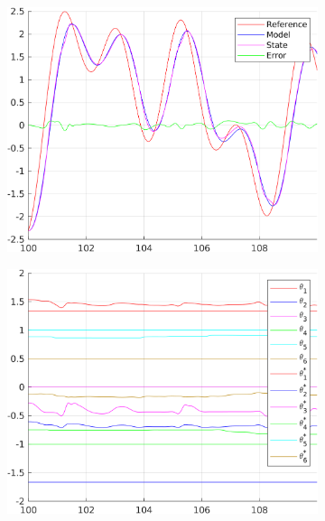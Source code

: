 \documentclass[12pt,a4paper]{article}
\begin{document}
	\begin{figure}[H]
		\centering
		\begin{subfigure}{.45\textwidth}
			\centering
			\includegraphics[width=1\textwidth]{Graphics/NonLinearState2.png}
		\end{subfigure}%
		\begin{subfigure}{.45\textwidth}
			\centering
			\includegraphics[width=1\textwidth]{Graphics/NonLinearParameters2.png}
		\end{subfigure}
		\begin{subfigure}{.45\textwidth}
			\centering

\end{subfigure}
\end{figure}
\end{document}
